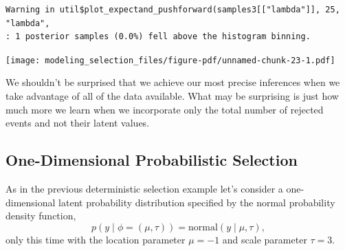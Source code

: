 \documentclass[
  letterpaper,
  DIV=11,
  numbers=noendperiod]{scrartcl}
\newenvironment{Shaded}{\begin{snugshade}}{\end{snugshade}}
\newcommand{\AttributeTok}[1]{\textcolor[rgb]{0.40,0.45,0.13}{#1}}
\newcommand{\DecValTok}[1]{\textcolor[rgb]{0.68,0.00,0.00}{#1}}
\newcommand{\FloatTok}[1]{\textcolor[rgb]{0.68,0.00,0.00}{#1}}
\newcommand{\FunctionTok}[1]{\textcolor[rgb]{0.28,0.35,0.67}{#1}}
\newcommand{\NormalTok}[1]{\textcolor[rgb]{0.00,0.23,0.31}{#1}}
\newcommand{\SpecialCharTok}[1]{\textcolor[rgb]{0.37,0.37,0.37}{#1}}
\newcommand{\StringTok}[1]{\textcolor[rgb]{0.13,0.47,0.30}{#1}}
\begin{document}
\begin{Shaded}
\end{Shaded}

\begin{verbatim}
Warning in util$plot_expectand_pushforward(samples3[["lambda"]], 25, "lambda",
: 1 posterior samples (0.0%) fell above the histogram binning.
\end{verbatim}

\texttt{[image: modeling\_selection\_files/figure-pdf/unnamed-chunk-23-1.pdf]}

We shouldn't be surprised that we achieve our most precise inferences
when we take advantage of all of the data available. What may be
surprising is just how much more we learn when we incorporate only the
total number of rejected events and not their latent values.

\subsection{One-Dimensional Probabilistic
Selection}\label{one-dimensional-probabilistic-selection}

As in the previous deterministic selection example let's consider a
one-dimensional latent probability distribution specified by the normal
probability density function, \[
p(y \mid \phi = (\mu, \tau) ) = \text{normal}(y \mid \mu, \tau),
\] only this time with the location parameter \(\mu = -1\) and scale
parameter \(\tau = 3\).
\end{document}
